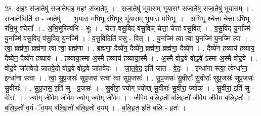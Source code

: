 \documentclass[17pt]{extarticle}
\begin{document}
28. अ॒हꣳ स॑जा॒तेषु॑ सजा॒तेष्व॒ह म॒हꣳ स॑जा॒तेषु॑ । . स॒जा॒तेषु॑ भूयासम् भूयासꣳ सजा॒तेषु॑ सजा॒तेषु॑ भूयासम् । . स॒जा॒तेष्विति॑ स - जा॒तेषु॑ । . भू॒या॒स॒ म॒भि॒भू र॑भि॒भूर् भू॑यासम् भूयास मभि॒भूः । . अ॒भि॒भू श्चेत्ता॒ चेत्ता॑ ऽभि॒भू र॑भि॒भू श्चेत्ता᳚ । . अ॒भि॒भूरित्य॑भि - भूः । . चेत्ता॑ वसु॒विद् व॑सु॒विच् चेत्ता॒ चेत्ता॑ वसु॒वित् । . व॒सु॒विद् यु॒नज्मि॑ यु॒नज्मि॑ वसु॒विद् व॑सु॒विद् यु॒नज्मि॑ । . व॒सु॒विदिति॑ वसु - वित् । . यु॒नज्मि॑ त्वा त्वा यु॒नज्मि॑ यु॒नज्मि॑ त्वा । . त्वा॒ ब्रह्म॑णा॒ ब्रह्म॑णा त्वा त्वा॒ ब्रह्म॑णा । . ब्रह्म॑णा॒ दैव्ये॑न॒ दैव्ये॑न॒ ब्रह्म॑णा॒ ब्रह्म॑णा॒ दैव्ये॑न । . दैव्ये॑न ह॒व्याय॑ ह॒व्याय॒ दैव्ये॑न॒ दैव्ये॑न ह॒व्याय॑ । . ह॒व्याया॒स्मा अ॒स्मै ह॒व्याय॑ ह॒व्याया॒स्मै । . अ॒स्मै वोढ॒वे वोढ॒वे᳚ ऽस्मा अ॒स्मै वोढ॒वे । . वोढ॒वे जा॑तवेदो जातवे॒दो वोढ॒वे वोढ॒वे जा॑तवेदः । . जा॒त॒वे॒द॒ इति॑ जात - वे॒दः॒ । . इन्धा॑ना स्त्वा॒ त्वेन्धा॑ना॒ इन्धा॑ना स्त्वा । . त्वा॒ सु॒प्र॒जसः॑ सुप्र॒जस॑ स्त्वा त्वा सुप्र॒जसः॑ । . सु॒प्र॒जसः॑ सु॒वीराः᳚ सु॒वीराः᳚ सुप्र॒जसः॑ सुप्र॒जसः॑ सु॒वीराः᳚ । . सु॒प्र॒जस॒ इति॑ सु - प्र॒जसः॑ । . सु॒वीरा॒ ज्योग् ज्योख् सु॒वीराः᳚ सु॒वीरा॒ ज्योक् । . सु॒वीरा॒ इति॑ सु - वीराः᳚ । . ज्योग् जी॑वेम जीवेम॒ ज्योग् ज्योग् जी॑वेम । . जी॒वे॒म॒ ब॒लि॒हृतो॑ बलि॒हृतो॑ जीवेम जीवेम बलि॒हृतः॑ । . ब॒लि॒हृतो॑ व॒यं ॅव॒यम् ब॑लि॒हृतो॑ बलि॒हृतो॑ व॒यम् । . ब॒लि॒हृत॒ इति॑ बलि - हृतः॑ । \newline
\end{document}
